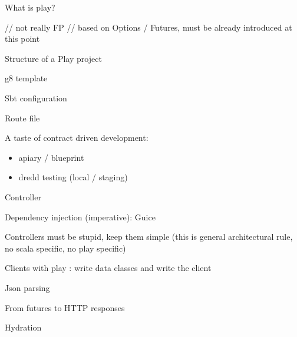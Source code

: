 \documentclass[10pt]{beamer}
\begin{document}
\begin{frame}
What is play?

// not really FP 
// based on Options / Futures, must be already introduced at this point 

\end{frame}

\begin{frame}
Structure of a Play project
\end{frame}
\begin{frame}
g8 template 
\end{frame}
\begin{frame}
Sbt configuration 
\end{frame}
\begin{frame}
Route file
\end{frame}

\begin{frame}
A taste of contract driven development:
\begin{itemize}
\item apiary / blueprint 
\item dredd testing (local / staging) 
\end{itemize}
\end{frame}

\begin{frame}
Controller 
\end{frame}

\begin{frame}
Dependency injection (imperative): Guice 
\end{frame}


\begin{frame}
Controllers must be stupid,  keep them simple (this is general architectural rule, no scala specific, no play specific)
\end{frame}


\begin{frame}
Clients with play : write data classes and write the client 
\end{frame}

\begin{frame}
Json parsing 
\end{frame}

\begin{frame}
From futures to HTTP responses 
\end{frame}


\begin{frame}
Hydration 
\end{frame}
\end{document}
